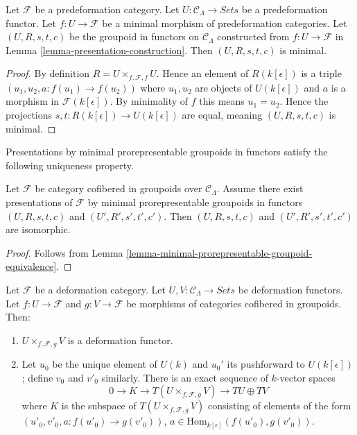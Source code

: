 \begin{lemma}
\label{lemma-minimal-groupoid-in-functors-construction}
Let $\mathcal{F}$ be a predeformation category.  Let $U: \mathcal{C}_\Lambda 
\to \textit{Sets}$ be a predeformation functor.  Let $f: U 
\to \mathcal{F}$ be a minimal morphism of predeformation categories. Let 
$(U,R,s,t,c)$ be the groupoid in functors on $\mathcal{C}_\Lambda$ constructed 
from $f: U \to \mathcal{F}$ in Lemma 
\ref{lemma-presentation-construction}.  Then $(U,R,s,t,c)$ is minimal. 
\end{lemma}

\begin{proof}
By definition $R = U \times_{f,\mathcal{F}, f} U$.  Hence an element of 
$R(k[\epsilon])$ is a triple $(u_1, u_2, a: f(u_1) \to f(u_2))$ 
where $u_1,u_2$ are objects of $U(k[\epsilon])$ and $a$ is a morphism in 
$\mathcal{F}(k[\epsilon])$.  By minimality of $f$ this means $u_1 = u_2$.  
Hence the projections $s,t: R(k[\epsilon]) \to U(k[\epsilon])$ 
are equal, meaning  $(U,R,s,t,c)$ is minimal.
\end{proof}

\noindent
Presentations by minimal prorepresentable groupoids in functors satisfy the 
following uniqueness property.

\begin{lemma}
\label{lemma-minimal-presentations-equivalent}
Let $\mathcal{F}$ be category cofibered in groupoids over $\mathcal 
C_\Lambda$. Assume there exist presentations of $\mathcal{F}$ by minimal 
prorepresentable groupoids in functors $(U,R,s,t,c)$ and $(U',R',s',t',c')$. 
Then $(U,R,s,t,c)$ and $(U',R',s',t',c')$ are isomorphic.
\end{lemma}

\begin{proof}
Follows from Lemma \ref{lemma-minimal-prorepresentable-groupoid-equivalence}.
\end{proof}

\begin{lemma}
\label{lemma-deformation-functor-fiber-product-morphisms}
Let $\mathcal{F}$ be a deformation category.  Let $U,V: \mathcal{C}_\Lambda 
\to \textit{Sets}$ be deformation functors.  Let $f: U 
\to \mathcal{F}$ and $g: V \to \mathcal{F}$ be morphisms of 
categories cofibered in groupoids. Then: 
\begin{enumerate}
\item $U \times_{f, \mathcal{F}, g} V$ is a deformation functor.
\item Let $u_0$ be the unique element of $U(k)$ and $u_0'$ its pushforward to 
$U(k[\epsilon])$; define $v_0$ and $v'_0$ similarly.  There is an exact 
sequence of $k$-vector spaces
\[ 
0 \to K \to T(U \times_{f, \mathcal{F}, g} V) \to TU 
\oplus TV 
\]
where $K$ is the subspace of $T(U \times_{f, \mathcal{F}, g} V)$ consisting of 
elements of the form $(u'_0, v'_0, a: f(u'_0) \to g(v'_0))$, $a \in 
\text{Hom}_{k[\epsilon]}(f(u'_0), g(v'_0))$.
\end{enumerate}
\end{lemma}

